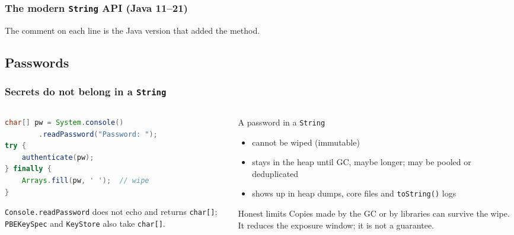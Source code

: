 \documentclass[aspectratio=169,10pt,compress]{beamer}
\begin{document}
\begin{frame}[t,fragile] \frametitle{The modern \texttt{String} API (Java 11--21)}

  \vspace{0.2em}
  \small The comment on each line is the Java version that added the method.
\end{frame}


\subsection[Passwords]{Passwords}




\begin{frame}[t,fragile] \frametitle{Secrets do not belong in a \texttt{String}}
  \begin{columns}[T]
    \begin{column}{0.5\textwidth}


\begin{lstlisting}[style=codesnippet, language=Java]
char[] pw = System.console()
        .readPassword("Password: ");
try {
    authenticate(pw);
} finally {
    Arrays.fill(pw, ' ');  // wipe
}
\end{lstlisting}



      \small \texttt{Console.readPassword} does not echo and returns \texttt{char[]};
      \texttt{PBEKeySpec} and \texttt{KeyStore} also take \texttt{char[]}.
    \end{column}
    \begin{column}{0.46\textwidth}
      \small A password in a \texttt{String}
      \begin{itemize}\small
        \item cannot be wiped (immutable)
        \item stays in the heap until GC, maybe longer; may be pooled or deduplicated
        \item shows up in heap dumps, core files and \texttt{toString()} logs
      \end{itemize}
      \begin{alertblock}{Honest limits}
        \small Copies made by the GC or by libraries can survive the wipe. It reduces the exposure window; it is not a guarantee.
      \end{alertblock}
    \end{column}
  \end{columns}
\end{frame}
\end{document}
